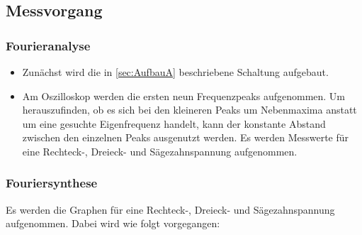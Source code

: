 \subsection{Messvorgang}

\subsubsection{Fourieranalyse}

\begin{itemize}

  \item Zunächst wird die in \ref{sec:AufbauA} beschriebene Schaltung aufgebaut.

  \item Am Oszilloskop werden die ersten neun Frequenzpeaks aufgenommen.
  Um herauszufinden, ob es sich bei den kleineren Peaks um
  Nebenmaxima anstatt um eine gesuchte Eigenfrequenz handelt, kann der
  konstante Abstand zwischen den einzelnen Peaks ausgenutzt werden.
  Es werden Messwerte für eine Rechteck-, Dreieck- und Sägezahnspannung
  aufgenommen.

\end{itemize}

\subsubsection{Fouriersynthese}

Es werden die Graphen für eine Rechteck-, Dreieck- und Sägezahnspannung
aufgenommen. Dabei wird wie folgt vorgegangen:

